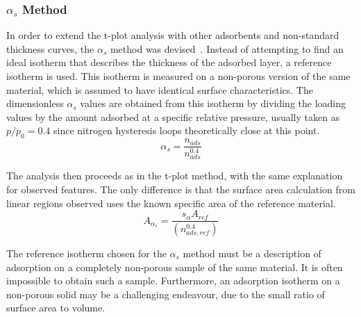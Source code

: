 \subsubsection{\(\alpha_s\) Method}\label{pyg:charac:alphasplot}

In order to extend the t-plot analysis with other adsorbents and
non-standard thickness curves, the \(\alpha_s\) method was
devised~\cite{atkinsonAdsorptivePropertiesMicroporous1984}.
Instead of attempting to find an ideal isotherm that describes the
thickness of the adsorbed layer, a reference isotherm is used.
This isotherm is measured on a non-porous version of the same material,
which is assumed to have identical surface characteristics.
The dimensionless \(\alpha_s\) values are obtained from this isotherm by
dividing the loading values by the amount adsorbed at a specific relative
pressure, usually taken as \(p/p_0=0.4\) since nitrogen hysteresis loops
theoretically close at this point.
%
\begin{equation}
	\alpha_s = \frac{n_{ads}}{n_{ads}^{0.4}}
\end{equation}

The analysis then proceeds as in the t-plot method, with the
same explanation for observed features. The only difference is
that the surface area calculation from linear regions observed
uses the known specific area of the reference material.
%
\begin{equation}
	A_{\alpha_s} = \frac{s_{\alpha} A_{ref}}{{(n_{ads, ref}^{0.4})}}
\end{equation}

The reference isotherm chosen for the \(\alpha_s\) method must
be a description of adsorption on a completely non-porous sample
of the same material. It is often impossible to obtain such
a sample. Furthermore, an adsorption isotherm on a non-porous
solid may be a challenging endeavour, due to the small ratio
of surface area to volume.